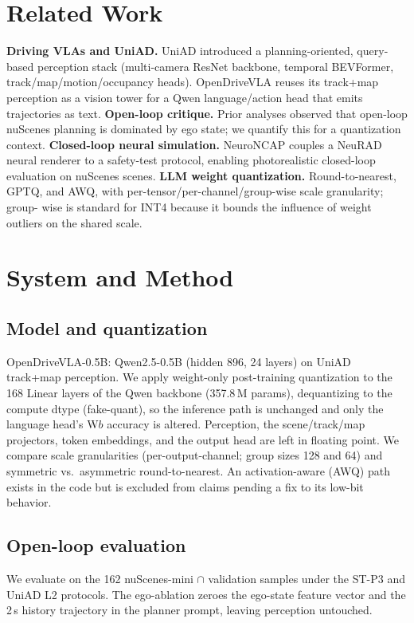 \documentclass[11pt]{article}
\begin{document}
\section{Related Work}
\textbf{Driving VLAs and UniAD.} UniAD introduced a planning-oriented, query-based perception stack
(multi-camera ResNet backbone, temporal BEVFormer, track/map/motion/occupancy heads). OpenDriveVLA
reuses its track+map perception as a vision tower for a Qwen language/action head that emits
trajectories as text. \textbf{Open-loop critique.} Prior analyses observed that open-loop nuScenes
planning is dominated by ego state; we quantify this for a quantization context. \textbf{Closed-loop
neural simulation.} NeuroNCAP couples a NeuRAD neural renderer to a safety-test protocol, enabling
photorealistic closed-loop evaluation on nuScenes scenes. \textbf{LLM weight quantization.}
Round-to-nearest, GPTQ, and AWQ, with per-tensor/per-channel/group-wise scale granularity; group-
wise is standard for INT4 because it bounds the influence of weight outliers on the shared scale.

\section{System and Method}
\subsection{Model and quantization}
OpenDriveVLA-0.5B: Qwen2.5-0.5B (hidden 896, 24 layers) on UniAD track+map perception. We apply
weight-only post-training quantization to the 168 Linear layers of the Qwen backbone (357.8\,M
params), dequantizing to the compute dtype (fake-quant), so the inference path is unchanged and only
the language head's W$b$ accuracy is altered. Perception, the scene/track/map projectors, token
embeddings, and the output head are left in floating point. We compare scale granularities
(per-output-channel; group sizes 128 and 64) and symmetric vs.\ asymmetric round-to-nearest. An
activation-aware (AWQ) path exists in the code but is excluded from claims pending a fix to its
low-bit behavior.

\subsection{Open-loop evaluation}
We evaluate on the 162 nuScenes-mini $\cap$ validation samples under the ST-P3 and UniAD L2
protocols. The ego-ablation zeroes the ego-state feature vector and the 2\,s history trajectory in
the planner prompt, leaving perception untouched.
\end{document}
